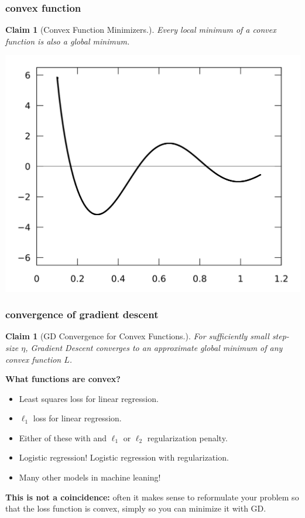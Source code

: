\documentclass[handout,compress]{beamer}
\newtheorem{claim}[theorem]{Claim}
\begin{document}
\begin{frame}[t]
	\frametitle{convex function}
		\begin{claim}[Convex Function Minimizers.]
		Every \emph{local} minimum of a convex function is also a \emph{global minimum}.
	\end{claim}
	\begin{center}
	\includegraphics[width=.7\textwidth]{local_min_blank.png}
	\end{center} 
\end{frame}

\begin{frame}[t]
	\frametitle{convergence of gradient descent}
	\begin{claim}[GD Convergence for Convex Functions.]
		For sufficiently small step-size $\eta$, Gradient Descent converges to an approximate global minimum of any convex function $L$.
	\end{claim}

	\textbf{What functions are convex?}
	\begin{itemize}
		\item Least squares loss for linear regression.
		\item $\ell_1$ loss for linear regression.
		\item Either of these with and $\ell_1$ or $\ell_2$ regularization penalty. 
		\item Logistic regression! Logistic regression with regularization.
		\item Many other models in machine leaning!
	\end{itemize}
\begin{center}
	\textbf{This is not a coincidence:} often it makes sense to reformulate your problem so that the loss function is convex, simply so you can minimize it with GD. 
\end{center}
\end{frame}
\end{document}
